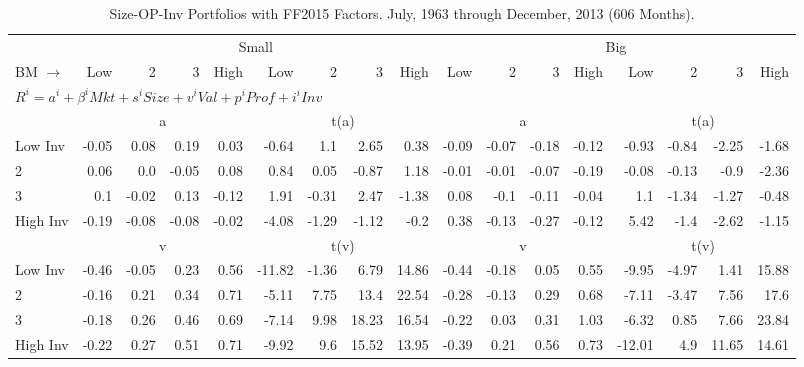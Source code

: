 
\begin{table}[!ht]
\centering
\caption{Size-OP-Inv Portfolios with FF2015 Factors. \footnotesize{July, 1963 through December, 2013 (606 Months).}}
\begin{tabular}{lrrrrrrrrrrrrrrrr}
  \toprule
    & \multicolumn{8}{c}{Small} & \multicolumn{8}{c}{Big} \\
      \cmidrule(r){2-9} \cmidrule(r){10-17}
    BM $\rightarrow$ & Low & 2 & 3 & High & Low & 2 & 3 & High & Low & 2 & 3 & High & Low & 2 & 3 & High \\ 
  \midrule
  \multicolumn{17}{l}{$R^i=a^i+\beta^iMkt+s^iSize+v^iVal+p^iProf+i^iInv$} \\

  
    
      & \multicolumn{4}{c}{a} & \multicolumn{4}{c}{t(a)}
    
      & \multicolumn{4}{c}{a} & \multicolumn{4}{c}{t(a)}
    
    \\
      \cmidrule(r){2-5} \cmidrule(r){6-9} \cmidrule(r){10-13} \cmidrule(r){14-17}

    Low Inv   & -0.05  & 0.08  & 0.19  & 0.03  & -0.64  & 1.1  & 2.65  & 0.38  & -0.09  & -0.07  & -0.18  & -0.12  & -0.93  & -0.84  & -2.25  & -1.68  \\
           2  & 0.06  & 0.0  & -0.05  & 0.08  & 0.84  & 0.05  & -0.87  & 1.18  & -0.01  & -0.01  & -0.07  & -0.19  & -0.08  & -0.13  & -0.9  & -2.36  \\
           3  & 0.1  & -0.02  & 0.13  & -0.12  & 1.91  & -0.31  & 2.47  & -1.38  & 0.08  & -0.1  & -0.11  & -0.04  & 1.1  & -1.34  & -1.27  & -0.48  \\
    High Inv  & -0.19  & -0.08  & -0.08  & -0.02  & -4.08  & -1.29  & -1.12  & -0.2  & 0.38  & -0.13  & -0.27  & -0.12  & 5.42  & -1.4  & -2.62  & -1.15  \\

  
    
      & \multicolumn{4}{c}{v} & \multicolumn{4}{c}{t(v)}
    
      & \multicolumn{4}{c}{v} & \multicolumn{4}{c}{t(v)}
    
    \\
      \cmidrule(r){2-5} \cmidrule(r){6-9} \cmidrule(r){10-13} \cmidrule(r){14-17}

    Low Inv   & -0.46  & -0.05  & 0.23  & 0.56  & -11.82  & -1.36  & 6.79  & 14.86  & -0.44  & -0.18  & 0.05  & 0.55  & -9.95  & -4.97  & 1.41  & 15.88  \\
           2  & -0.16  & 0.21  & 0.34  & 0.71  & -5.11  & 7.75  & 13.4  & 22.54  & -0.28  & -0.13  & 0.29  & 0.68  & -7.11  & -3.47  & 7.56  & 17.6  \\
           3  & -0.18  & 0.26  & 0.46  & 0.69  & -7.14  & 9.98  & 18.23  & 16.54  & -0.22  & 0.03  & 0.31  & 1.03  & -6.32  & 0.85  & 7.66  & 23.84  \\
    High Inv  & -0.22  & 0.27  & 0.51  & 0.71  & -9.92  & 9.6  & 15.52  & 13.95  & -0.39  & 0.21  & 0.56  & 0.73  & -12.01  & 4.9  & 11.65  & 14.61  \\


\end{tabular}
\end{table}
